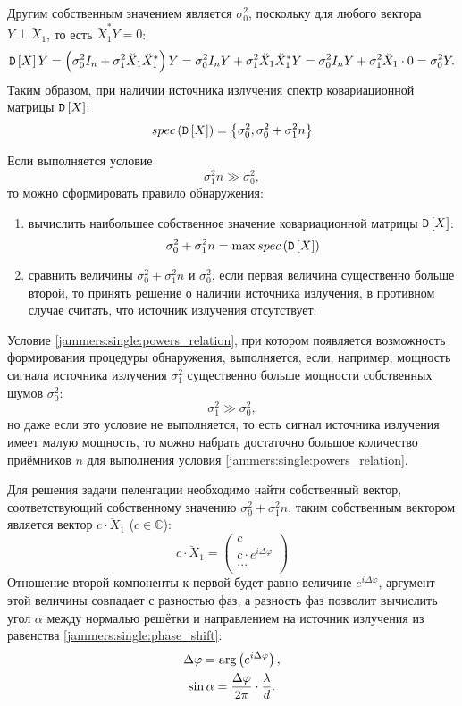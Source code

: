 Другим собственным значением является $\sigma_0^2$, поскольку для любого вектора $Y \perp \breve{X}_1$, то есть $\breve{X}_1^* Y = 0$:
\[
    \mathtt{D} \left [ X \right ] Y
    = \left( \sigma_0^2 I_n + \sigma_1^2 \breve{X}_1 \breve{X}_1^* \right) Y
    = \sigma_0^2 I_n Y + \sigma_1^2 \breve{X}_1 \breve{X}_1^* Y
    = \sigma_0^2 I_n Y + \sigma_1^2 \breve{X}_1 \cdot 0
    = \sigma_0^2 Y .
\]
Таким образом, при наличии источника излучения спектр ковариационной матрицы $\mathtt{D} \left [ X \right ]$:
\[
    spec \left ( \mathtt{D} \left [ X \right ] \right ) = \left \{ \sigma_0^2, \sigma_0^2 + \sigma_1^2 n \right \}
\]

Если выполняется условие
\begin{equation}
    \label{jammers:single:powers_relation}
    \sigma_1^2 n \gg \sigma_0^2 ,
\end{equation}
то можно сформировать правило обнаружения:
\begin{enumerate}
    \item вычислить наибольшее собственное значение ковариационной матрицы $\mathtt{D} \left [ X \right ]$:
    \[
        \sigma_0^2 + \sigma_1^2 n = \max spec \left ( \mathtt{D} \left [ X \right ] \right )
    \]
    \item сравнить величины $\sigma_0^2 + \sigma_1^2 n$ и $\sigma_0^2$, если первая величина существенно больше второй, то принять решение о наличии источника
    излучения, в противном случае считать, что источник излучения отсутствует.
\end{enumerate}

Условие \eqref{jammers:single:powers_relation}, при котором появляется возможность формирования процедуры обнаружения, выполняется, если, например, мощность
сигнала источника излучения $\sigma_1^2$ существенно больше мощности собственных шумов $\sigma_0^2$:
\[
    \sigma_1^2 \gg \sigma_0^2 ,
\]
но даже если это условие не выполняется, то есть сигнал источника излучения имеет малую мощность, то можно набрать достаточно большое количество приёмников $n$
для выполнения условия \eqref{jammers:single:powers_relation}.

Для решения задачи пеленгации необходимо найти собственный вектор, соответствующий собственному значению $\sigma_0^2 + \sigma_1^2 n$, таким собственным вектором
является вектор $c \cdot \breve{X}_1$ ($c \in \mathbb{C}$):
\[
    c \cdot \breve{X}_1
    = \begin{pmatrix}
          c                            \\
          c \cdot e^{i \Delta \varphi} \\
          ...                          \\
    \end{pmatrix}
\]
Отношение второй компоненты к первой будет равно величине $e^{i \Delta \varphi}$, аргумент этой величины совпадает с разностью фаз, а разность фаз позволит вычислить угол $\alpha$
между нормалью решётки и направлением на источник излучения из равенства \eqref{jammers:single:phase_shift}:
\begin{gather}
    \Delta \varphi = \arg \left( e^{i \Delta \varphi} \right), \notag \\
    \sin \alpha = \frac{\Delta \varphi}{2 \pi} \cdot \frac{\lambda}{d} \label{jammers:single:angle}.
\end{gather}

